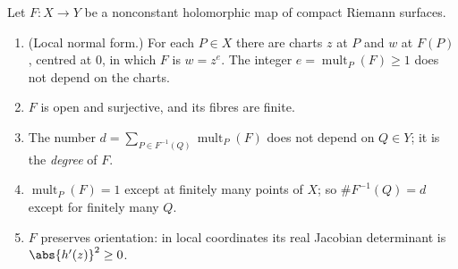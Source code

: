 \begin{theorem}\label{thm:curves:holomorphic-maps}
Let $F\colon X\to Y$ be a nonconstant holomorphic map of compact Riemann surfaces.
\begin{enumerate}[label=(\alph*)]
\item (Local normal form.) For each $P\in X$ there are charts $z$ at $P$ and $w$ at $F(P)$, centred at $0$, in which $F$ is $w=z^e$. The integer
$e=\operatorname{mult}_P(F)\ge1$ does not depend on the charts.
\item $F$ is open and surjective, and its fibres are finite.
\item The number $d=\sum_{P\in F^{-1}(Q)}\operatorname{mult}_P(F)$ does not depend on $Q\in Y$; it is the \emph{degree} of $F$.
\item $\operatorname{mult}_P(F)=1$ except at finitely many points of $X$; so $\#F^{-1}(Q)=d$ except for finitely many $Q$.
\item $F$ preserves orientation: in local coordinates its real Jacobian determinant is $\abs{h'(z)}^2\ge0$.
\end{enumerate}
\end{theorem}

